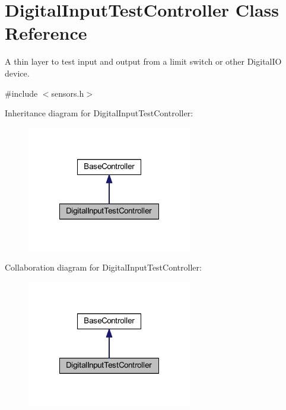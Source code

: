 \hypertarget{class_digital_input_test_controller}{\section{\-Digital\-Input\-Test\-Controller \-Class \-Reference}
\label{class_digital_input_test_controller}
}


\-A thin layer to test input and output from a limit switch or other \-Digital\-I\-O device.  




{\ttfamily \#include $<$sensors.\-h$>$}



\-Inheritance diagram for \-Digital\-Input\-Test\-Controller\-:\nopagebreak
\begin{figure}[H]
\begin{center}
\leavevmode
\includegraphics[width=204pt]{class_digital_input_test_controller__inherit__graph}
\end{center}
\end{figure}


\-Collaboration diagram for \-Digital\-Input\-Test\-Controller\-:\nopagebreak
\begin{figure}[H]
\begin{center}
\leavevmode
\includegraphics[width=204pt]{class_digital_input_test_controller__coll__graph}
\end{center}
\end{figure}
